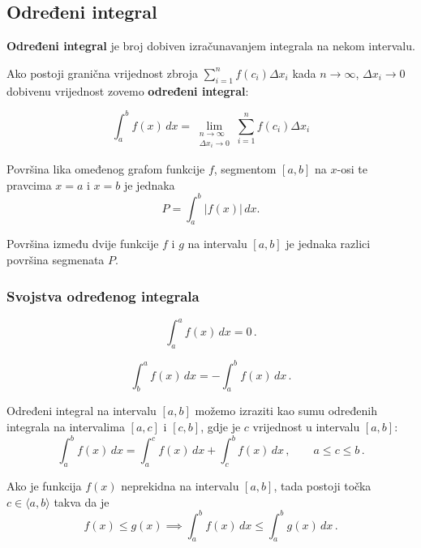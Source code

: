 \subsection{Određeni integral}

\textbf{Određeni integral} je broj dobiven izračunavanjem integrala na nekom
intervalu.

\begin{definition}
    Ako postoji granična vrijednost zbroja $\sum_{i=1}^n f(c_i)\Delta x_i$ kada $n \to \infty$, $\Delta x_i \to 0$ dobivenu vrijednost zovemo \textbf{određeni integral}:

    $$
        \int_a^b f(x)\,dx = \lim_{\substack{n \to \infty \\ \Delta x_i \to 0}} \sum_{i=1}^n f(c_i)\Delta x_i
    $$
\end{definition}

Površina lika omeđenog grafom funkcije $f$, segmentom $[a, b]$ na $x$-osi te pravcima $x=a$ i $x=b$ je jednaka
$$
    P=\int_a^b |f(x)|\,dx.
$$

Površina između dvije funkcije $f$ i $g$ na intervalu $[a, b]$ je jednaka razlici površina segmenata $P$.

\subsubsection{Svojstva određenog integrala}

\begin{proposition}
    $$
    \int_a^a f(x)\,dx = 0\,.
    $$
\end{proposition}

\begin{proposition}
    $$
    \int_b^a f(x)\,dx = -\int_a^b f(x)\,dx\,.
    $$
\end{proposition}

\begin{proposition}
    Određeni integral na intervalu $[a, b]$ možemo izraziti kao sumu određenih integrala na intervalima $[a, c]$ i $[c, b]$, gdje je $c$ vrijednost u intervalu $[a, b]$:
    $$
    \int_a^b f(x)\,dx = \int_a^c f(x)\,dx + \int_c^b f(x)\,dx\,,\qquad a\leq c \leq b\,.
    $$
\end{proposition}

\begin{proposition}
    Ako je funkcija $f(x)$ neprekidna na intervalu $[a, b]$, tada postoji točka $c \in \langle a, b\rangle$ takva da je
    $$
    f(x) \leq g(x) \implies \int_a^b f(x)\,dx \leq \int_a^b g(x)\,dx\,.
    $$
\end{proposition}


